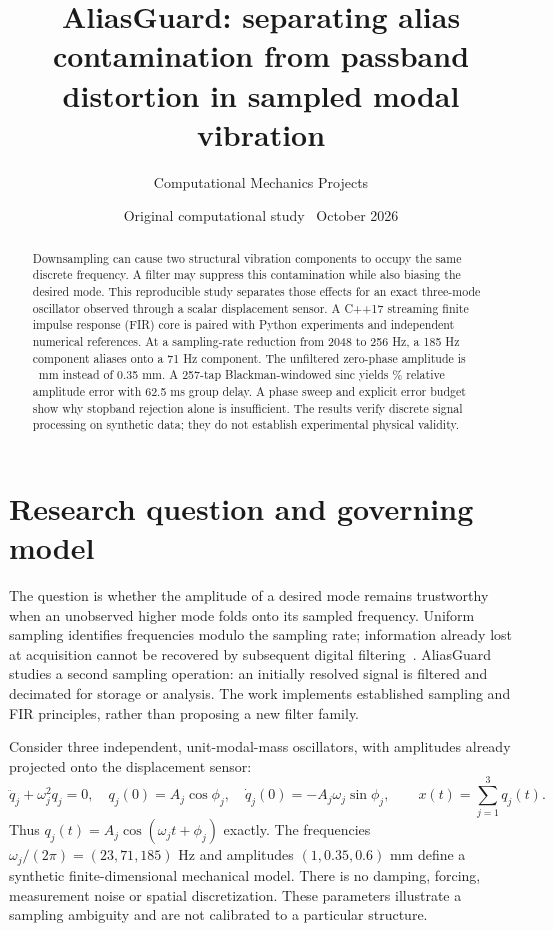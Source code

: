 \documentclass[10pt,a4paper]{article}
\title{AliasGuard: separating alias contamination from passband\protect\\
distortion in sampled modal vibration}
\author{Computational Mechanics Projects}
\date{Original computational study \textbar\ October 2026}
\begin{document}
\maketitle
\begin{abstract}
Downsampling can cause two structural vibration components to occupy the same
discrete frequency. A filter may suppress this contamination while also biasing
the desired mode. This reproducible study separates those effects for an exact
three-mode oscillator observed through a scalar displacement sensor. A C++17
streaming finite impulse response (FIR) core is paired with Python experiments
and independent numerical references. At a sampling-rate reduction from 2048 to
256 Hz, a 185 Hz component aliases onto a 71 Hz component. The unfiltered
zero-phase amplitude is \RawAmplitude\ mm instead of 0.35 mm. A 257-tap
Blackman-windowed sinc yields \FinePercent\% relative amplitude error with
62.5 ms group delay. A phase sweep and explicit error budget show why stopband
rejection alone is insufficient. The results verify discrete signal processing
on synthetic data; they do not establish experimental physical validity.
\end{abstract}

\section{Research question and governing model}
The question is whether the amplitude of a desired mode remains trustworthy when
an unobserved higher mode folds onto its sampled frequency. Uniform sampling
identifies frequencies modulo the sampling rate; information already lost at
acquisition cannot be recovered by subsequent digital filtering~\cite{sampling}.
AliasGuard studies a second sampling operation: an initially resolved signal is
filtered and decimated for storage or analysis. The work implements established
sampling and FIR principles, rather than proposing a new filter family.

Consider three independent, unit-modal-mass oscillators, with amplitudes already
projected onto the displacement sensor:
\begin{equation}
 \ddot q_j+\omega_j^2q_j=0,\quad
 q_j(0)=A_j\cos\phi_j,\quad \dot q_j(0)=-A_j\omega_j\sin\phi_j,
 \qquad x(t)=\sum_{j=1}^3q_j(t).
 \label{eq:model}
\end{equation}
Thus $q_j(t)=A_j\cos(\omega_jt+\phi_j)$ exactly. The frequencies
$\omega_j/(2\pi)=(23,71,185)$ Hz and amplitudes $(1,0.35,0.6)$ mm define a
synthetic finite-dimensional mechanical model. There is no damping, forcing,
measurement noise or spatial discretization. These parameters illustrate a
sampling ambiguity and are not calibrated to a particular structure.
\end{document}
